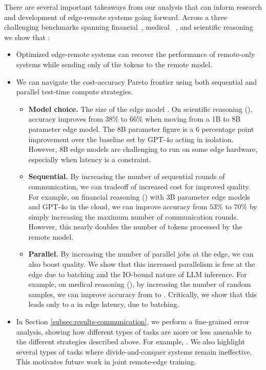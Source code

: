 There are several important takeaways from our analysis that can inform research and development of edge-remote systems going forward. Across a three challenging benchmarks spanning financial~\cite{islam2023financebench}, medical ~\cite{adams2024longhealth}, and scientific reasoning ~\cite{dasigi2021dataset} we show that :
\begin{itemize}
  \item Optimized edge-remote systems can recover the performance of remote-only systems while sending only  of the tokens to the remote model.
  \item We can navigate the cost-accuracy Pareto frontier using both sequential and parallel test-time compute strategies. 
    \begin{itemize}
        \item \textbf{Model choice.} The size of the edge model . On scientific reasoning (\qasper), accuracy improves from $38\%$ to $66\%$ when moving from a 1B to 8B parameter edge model. The 8B parameter figure is a 6 percentage point improvement over the baseline set by GPT-4o acting in isolation. However, 8B edge models are challenging to run on some edge hardware, especially when latency is a constraint.
        \item \textbf{Sequential.} By increasing the number of sequential rounds of communication, we can tradeoff of increased cost for improved quality. For example, on financial reasoning (\finance) with 3B parameter edge models and GPT-4o in the cloud, we can improve accuracy from $53\%$ to $70\%$ by simply increasing the maximum number of communication rounds. However, this nearly doubles the number of tokens processed by the remote model.
        \item \textbf{Parallel.} By increasing the number of parallel jobs at the edge, we can also boost quality. We show that this increased parallelism is free at the edge due to batching and the IO-bound nature of LLM inference.  For example, on medical reasoning (\longhealth), by increasing the number of random samples, we can improve accuracy from  to . Critically, we show that this leads only to a  in edge latency, due to batching.
    \end{itemize}
  \item In Section \ref{subsec:results-communication}, we perform a fine-grained error analysis, showing how different types of tasks are more or less amenable to the different strategies described above. For example, . We also highlight several types of tasks where divide-and-conquer systems remain ineffective. This motivates future work in joint remote-edge training. 
\end{itemize}


